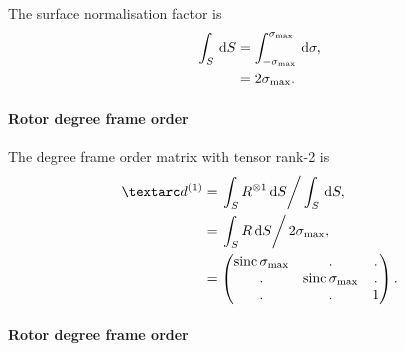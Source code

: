 The surface normalisation factor is
\begin{subequations}
\begin{align}
    \int_S \,\mathrm{d} S &= \int_{-\sigma_\textrm{max}}^{\sigma_\textrm{max}} \,\mathrm{d} \sigma , \\
                   &= 2\sigma_\textrm{max} .
\end{align}
\end{subequations}


\paragraph{Rotor  degree frame order}

The  degree frame order matrix with tensor rank-2 is
\begin{subequations} \label{eq: rotor 1st degree frame order matrix}
\begin{align}
    \FOone &= \left. \int_S R^{\otimes 1} \diff S \right / \int_S \diff S, \\
           &= \left. \int_S R \diff S \right / 2\conesmax, \\
           &= \begin{pmatrix}
                  \sinc\conesmax & .              & . \\
                  .              & \sinc\conesmax & . \\
                  .              & .              & 1 \\
              \end{pmatrix} .
\end{align}
\end{subequations}


\paragraph{Rotor  degree frame order}

